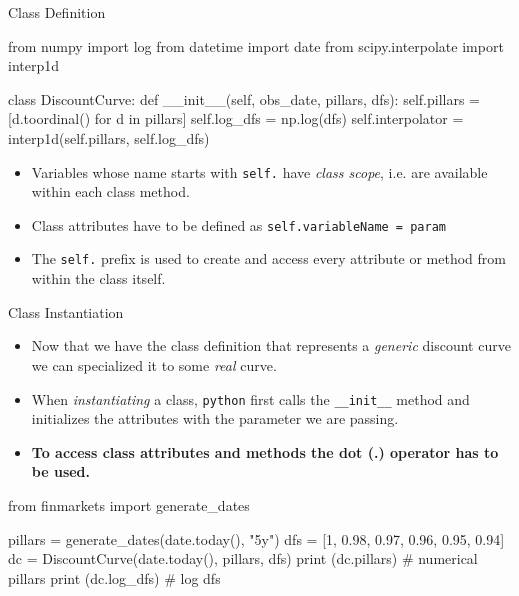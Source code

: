 \documentclass{beamer}
\begin{document}
\begin{frame}[fragile]{Class Definition}
\begin{ipython}
from numpy import log
from datetime import date
from scipy.interpolate import interp1d  
	
class DiscountCurve:
    def __init__(self, obs_date, pillars, dfs):
        self.pillars = [d.toordinal() for d in pillars]
        self.log_dfs = np.log(dfs)
        self.interpolator = interp1d(self.pillars, self.log_dfs)
\end{ipython}
\begin{itemize}
\item Variables whose name starts with \texttt{self.} have \emph{class scope}, i.e. are available within each class method.
\item Class attributes have to be defined as \texttt{self.variableName = param}
\item The \texttt{self.} prefix is used to create and access every attribute or method from within the class itself.
\end{itemize}
\end{frame}

\begin{frame}[fragile]{Class Instantiation}
  \begin{itemize}
  \item Now that we have the class definition that represents a \emph{generic} discount curve we can specialized it to some \emph{real} curve.
  \item When \emph{instantiating} a class, \texttt{python} first calls the \texttt{\_\_init\_\_} method and initializes the attributes with the parameter we are passing.
  \item \textbf{To access class attributes and methods the dot (.) operator has to be used.}
  \end{itemize}
\begin{ipython}
from finmarkets import generate_dates
			
pillars = generate_dates(date.today(), "5y")
dfs = [1, 0.98, 0.97, 0.96, 0.95, 0.94]      
dc = DiscountCurve(date.today(), pillars, dfs)
print (dc.pillars) # numerical pillars
print (dc.log_dfs) # log dfs
\end{ipython}
\begin{ioutput}
[738755 738761 739127 739492 739857 740222 740588]
[ 0.          0.         -0.02020271 -0.03045921 -0.04082199 -0.05129329
 -0.0618754 ]
\end{ioutput}
\end{frame}
\end{document}
